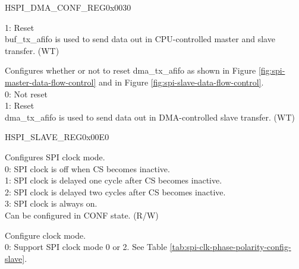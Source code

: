 \begin{register}{H}{SPI\_DMA\_CONF\_REG}{0x0030}
\begin{regdesc}
\begin{reglist}
1: Reset \\
buf\_tx\_afifo is used to send data out in CPU-controlled master and slave transfer. (WT)
\label{fielddesc:SPIDMAAFIFORST}\item [SPI\_DMA\_AFIFO\_RST] Configures whether or not to reset dma\_tx\_afifo as shown in Figure \ref{fig:spi-master-data-flow-control} and in Figure  \ref{fig:spi-slave-data-flow-control}. \\
0: Not reset \\
1: Reset \\
dma\_tx\_afifo is used to send data out in DMA-controlled slave transfer. (WT)
\end{reglist}\end{regdesc}
\end{register}


\begin{register}{H}{SPI\_SLAVE\_REG}{0x00E0}\label{regdesc:SPISLAVEREG}
%
%
%
%
%
%
%
%
%
%
%
%
%
%
%
%
\regnewline%
\begin{regdesc}\begin{reglist}
\label{fielddesc:SPICLKMODE}\item [SPI\_CLK\_MODE] Configures SPI clock mode. \\
0: SPI clock is off when CS becomes inactive. \\
1: SPI clock is delayed one cycle after CS becomes inactive. \\
2: SPI clock is delayed two cycles after CS becomes inactive. \\
3: SPI clock is always on. \\
Can be configured in CONF state. (R/W)
\label{fielddesc:SPICLKMODE13}\item [SPI\_CLK\_MODE\_13] Configure clock mode. \\
0: Support SPI clock mode 0 or 2. See Table \ref{tab:spi-clk-phase-polarity-config-slave}.\\

\end{reglist}
\end{regdesc}
\end{register}
